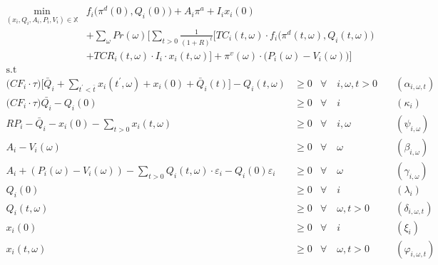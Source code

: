 \begin{align}
\min_{(x_i,Q_i,A_i,P_i,V_i)\in \mathbb{X}} & f_i \big( \pi^d(0),Q_i(0)\big)+ A_i \pi^{a} + I_i x_i(0) \nonumber \\ 
& + \sum_{\omega} Pr(\omega)   \Bigg[ \sum_{t>0} \frac{1}{(1+R)^t} \Big[ TC_i(t,\omega)\cdot f_i \big( \pi^d(t,\omega),Q_i(t,\omega) \big) \nonumber \\
& + TCR_i(t,\omega) \cdot I_i\cdot x_i(t,\omega) \Big] + \pi^v(\omega)\cdot \big(P_i(\omega)-V_i(\omega)\big) \Bigg] \label{fo:prod} \\
\textrm{s.t \ } \nonumber
\end{align}
\begin{align}
\Big(CF_i \cdot\tau\Big)  \Bigg[\bar{Q}_i + \sum_{t^{\prime}<\bar{t}} x_i(t^\prime,\omega) + x_i(0)+ \bar{Q}_i(t) \Bigg] - Q_i(t,\omega) & \geq 0  & \forall  \quad i,\omega, t  > 0 & \quad (\alpha_{i,\omega,t})\label{res:1} \\
\Big(CF_i\cdot\tau \Big)\bar{Q_i}-Q_{i}(0) & \geq 0  & \forall  \quad i & \quad (\kappa_i) \label{res:2} \\
RP_i - \bar{Q}_i  - x_i(0) - \sum_{t > 0} x_i(t,\omega) & \geq 0 &  \forall \quad i,\omega &   \quad (\psi_{i,\omega}) \label{res:3} \\
A_{i} -V_i(\omega) & \geq  0  & \forall  \quad \omega & \quad (\beta_{i,\omega}) \label{res:4} \\
A_{i} + (P_i(\omega) - V_i(\omega))-\sum_{t>0}Q_i(t, \omega)\cdot \varepsilon_{i}-Q_i(0)\varepsilon_{i} & \geq  0  &\forall \quad \omega & \quad (\gamma_{i,\omega})\label{res:5} \\
Q_i(0) & \geq  0 & \forall \quad i & \quad (\lambda_i) \label{res:q0} \\ 
Q_i(t, \omega) & \geq  0   & \forall \quad \omega, t >0 & \quad (\delta_{i,\omega,t})\label{res:qt} \\
x_i(0) & \geq  0 & \forall  \quad i & \quad (\xi_i)  \label{res:capi0} \\ 
x_i(t, \omega) & \geq  0   & \forall  \quad \omega, t >0 & \quad (\varphi_{i,\omega,t})\label{res:capt}
\end{align}


